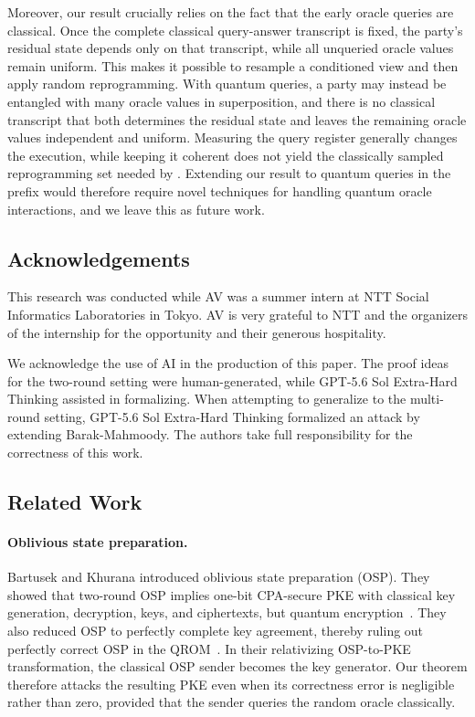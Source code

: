 \documentclass[11pt]{article}
\begin{document}
Moreover, our result crucially relies on the fact that the early oracle queries are
classical. Once the complete classical query-answer transcript is fixed, the
party's residual state depends only on that transcript, while all unqueried
oracle values remain uniform. This makes it possible to resample a conditioned
view and then apply random reprogramming. With quantum queries, a party
may instead be entangled with many oracle values in superposition,
and there is no classical transcript that both determines the
residual state and leaves the remaining oracle values independent and
uniform. Measuring the query register generally changes the execution, while
keeping it coherent does not yield the classically sampled
reprogramming set needed by . Extending our result to
quantum queries in the prefix would therefore require novel techniques for handling quantum oracle interactions, and we leave this as future work.


\subsection{Acknowledgements}

This research was conducted while AV was a summer intern at NTT Social Informatics Laboratories
in Tokyo. AV is very grateful to NTT and the organizers of the internship for the opportunity and their generous hospitality. 

We acknowledge the use of AI in the production of this paper.  The proof ideas for the two-round setting were human-generated, while GPT-5.6 Sol Extra-Hard Thinking assisted in formalizing. When attempting to generalize to the multi-round setting, GPT-5.6 Sol Extra-Hard Thinking formalized an attack by extending Barak-Mahmoody. The authors take full responsibility for the correctness of this work.

\subsection{Related Work}

\paragraph{Oblivious state preparation.}
Bartusek and Khurana introduced oblivious state preparation (OSP). They showed
that two-round OSP implies one-bit CPA-secure PKE with classical key
generation, decryption, keys, and ciphertexts, but quantum
encryption~\cite[Theorem~7.9]{BartusekKhurana24}. They also reduced OSP to
perfectly complete key agreement, thereby ruling out perfectly correct OSP
in the QROM~\cite[Corollary~7.7]{BartusekKhurana24}. In their relativizing
OSP-to-PKE transformation, the classical OSP sender becomes the key
generator. Our theorem therefore attacks the resulting PKE even when its
correctness error is negligible rather than zero, provided that the sender
queries the random oracle classically.
\end{document}
